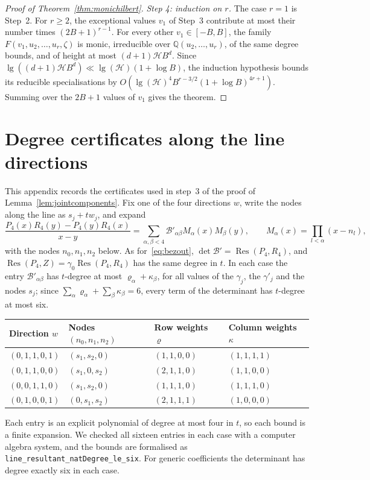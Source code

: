 \documentclass[11pt]{article}
\theoremstyle{definition}
\theoremstyle{remark}
\newcommand{\lean}[1]{\nolinkurl{#1}}
\begin{document}
\begin{proof}[Proof of Theorem~\ref{thm:monichilbert}]
\emph{Step 4: induction on $r$.} The case $r=1$ is Step~2. For $r\ge2$, the
exceptional values $v_1$ of Step~3 contribute at most their number times
$(2B+1)^{r-1}$. For every other $v_1\in[-B,B]$, the family
$F(v_1,u_2,\dots,u_r,\zeta)$ is monic, irreducible over $\mathbb Q(u_2,\dots,u_r)$, of
the same degree bounds, and of height at most $(d+1)\mathcal HB^d$. Since
$\operatorname{lg}((d+1)\mathcal HB^d)\ll\operatorname{lg}(\mathcal H)(1+\log B)$, the induction hypothesis
bounds its reducible specialisations by
$O(\operatorname{lg}(\mathcal H)^4B^{r-3/2}(1+\log B)^{4r+1})$. Summing over the $2B+1$
values of $v_1$ gives the theorem.
\end{proof}

\section{Degree certificates along the line directions}\label{app:linecertificates}

This appendix records the certificates used in step~3 of the proof of
Lemma~\ref{lem:jointcomponents}. Fix one of the four directions $w$, write the nodes along
the line as $s_j+tw_j$, and expand
\[
 \frac{P_4(x)R_4(y)-P_4(y)R_4(x)}{x-y}
 =\sum_{\alpha,\beta<4}\mathcal B'_{\alpha\beta}M_\alpha(x)M_\beta(y),\qquad
 M_\alpha(x)=\prod_{l<\alpha}(x-n_l),
\]
with the nodes $n_0,n_1,n_2$ below. As for~\eqref{eq:bezout},
$\det\mathcal B'=\operatorname{Res}(P_4,R_4)$, and
$\operatorname{Res}(P_4,Z)=\gamma_0\operatorname{Res}(P_4,R_4)$ has the same degree in $t$.
In each case the entry $\mathcal B'_{\alpha\beta}$ has $t$-degree at most
$\varrho_\alpha+\kappa_\beta$, for all values of the $\gamma_j$, the $\gamma'_j$ and the
nodes $s_j$; since $\sum_\alpha\varrho_\alpha+\sum_\beta\kappa_\beta=6$, every term of the
determinant has $t$-degree at most six.
\begin{center}\small
\begin{tabular}{@{}llll@{}}
\toprule
Direction $w$ & Nodes $(n_0,n_1,n_2)$ & Row weights $\varrho$ & Column weights $\kappa$\\
\midrule
$(0,1,1,0,1)$ & $(s_1,s_2,0)$ & $(1,1,0,0)$ & $(1,1,1,1)$\\
$(0,1,1,0,0)$ & $(s_1,0,s_2)$ & $(2,1,1,0)$ & $(1,1,0,0)$\\
$(0,0,1,1,0)$ & $(s_1,s_2,0)$ & $(1,1,1,0)$ & $(1,1,1,0)$\\
$(0,1,0,0,1)$ & $(0,s_1,s_2)$ & $(2,1,1,1)$ & $(1,0,0,0)$\\
\bottomrule
\end{tabular}
\end{center}
Each entry is an explicit polynomial of degree at most four in $t$, so each bound is a finite
expansion. We checked all sixteen entries in each case with a computer algebra system, and
the bounds are formalised as \lean{line_resultant_natDegree_le_six}. For generic
coefficients the determinant has degree exactly six in each case.
\end{document}
